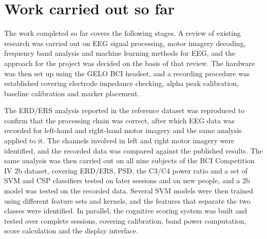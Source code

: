 \section{Work carried out so far}

The work completed so far covers the following stages. A review of existing research was
carried out on EEG signal processing, motor imagery decoding, frequency band analysis and
machine learning methods for EEG, and the approach for the project was decided on the basis
of that review. The hardware was then set up using the GELO BCI headset, and a recording
procedure was established covering electrode impedance checking, alpha peak calibration,
baseline calibration and marker placement.

The ERD/ERS analysis reported in the reference dataset was reproduced to confirm that the
processing chain was correct, after which EEG data was recorded for left-hand and
right-hand motor imagery and the same analysis applied to it. The channels involved in left
and right motor imagery were identified, and the recorded data was compared against the
published results. The same analysis was then carried out on all nine subjects of the BCI
Competition IV 2b dataset, covering ERD/ERS, PSD, the C3/C4 power ratio and a set of SVM and
CSP classifiers tested on later sessions and on new people, and a 2b model was tested on
the recorded data. Several SVM models were then trained using different feature sets and
kernels, and the features that separate the two classes were identified. In parallel, the
cognitive scoring system was built and tested over complete sessions, covering calibration,
band power computation, score calculation and the display interface.